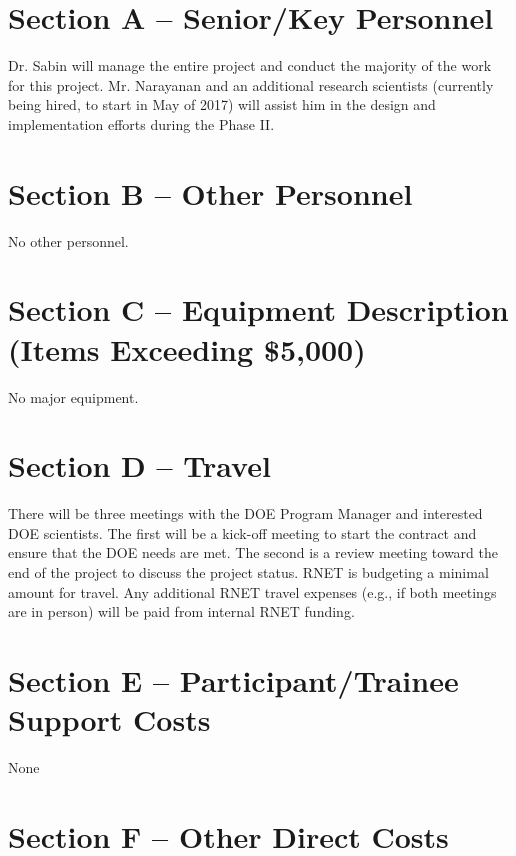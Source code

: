 

\section{Section A -- Senior/Key Personnel}
Dr. Sabin will manage the entire project and conduct the majority of
the work for this project. Mr. Narayanan and an additional research
scientists (currently being hired, to start in May of 2017) will
assist him in the design and implementation efforts during the Phase
II.

\section{Section B -- Other Personnel}
No other personnel.

\section{Section C -- Equipment Description (Items Exceeding \$5,000)}
No major equipment.

\section{Section D -- Travel}
There will be three meetings with the DOE Program Manager and interested
DOE scientists. The first will be a kick-off meeting to start the
contract and ensure that the DOE needs are met. The second is a review
meeting toward the end of the project to discuss the project status.
RNET is budgeting a minimal amount for travel. Any additional RNET
travel expenses (e.g., if both meetings are in person) will be paid
from internal RNET funding.

\section{Section E -- Participant/Trainee Support Costs}
None
  
\section{Section F -- Other Direct Costs}
